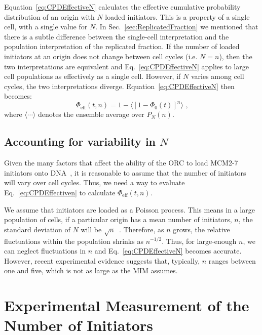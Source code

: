 {		Equation~\ref{eq:CPDEffectiveN} calculates the effective cumulative probability distribution of an origin with $N$ loaded initiators.
		This is a property of a single cell, with a single value for $N$.
		In Sec.~\ref{sec:ReplicatedFraction} we mentioned that there is a subtle difference between the single-cell interpretation and the population interpretation of the replicated fraction.
		If the number of loaded initiators at an origin does not change between cell cycles (i.e. $N=n$), then the two interpretations are equivalent and Eq.~\ref{eq:CPDEffectiveN} applies to large cell populations as effectively as a single cell.
		However, if $N$ varies among cell cycles, the two interpretations diverge.
		Equation~\ref{eq:CPDEffectiveN} then becomes:
		\begin{equation} \label{eq:CPDEffectiven}
			\Phi_{\text{eff}}(t,n) = 1 - \langle\left[1 - \Phi_0(t)\right]^n\rangle\text{ ,}
		\end{equation}
		where $\langle \cdots \rangle$ denotes the ensemble average over $P_N(n)$.
		
		
		\subsection{Accounting for variability in $N$}
		\label{subsec:VariableN}
		
		Given the many factors that affect the ability of the ORC to load MCM2-7 initiators onto DNA~\cite{MultiMCM}, it is reasonable to assume that the number of initiators will vary over cell cycles.
		Thus, we need a way to evaluate Eq.~\ref{eq:CPDEffectiven} to calculate $\Phi_\text{eff}(t,n)$.
		
		We assume that initiators are loaded as a Poisson process.
		This means in a large population of cells, if a particular origin has a mean number of initiators, $n$, the standard deviation of $N$ will be $\sqrt{n}$~\cite{cowan}.
		Therefore, as $n$ grows, the relative fluctuations within the population shrinks as $n^{-1/2}$.
		Thus, for large-enough $n$, we can neglect fluctuations in $n$ and Eq.~\ref{eq:CPDEffectiveN} becomes accurate.
		However, recent experimental evidence suggests that, typically, $n$ ranges between one and five, which is not as large as the MIM assumes.
		
	\section{Experimental Measurement of the Number of Initiators}
	\label{sec:ExperimentsMIM}
	
}
